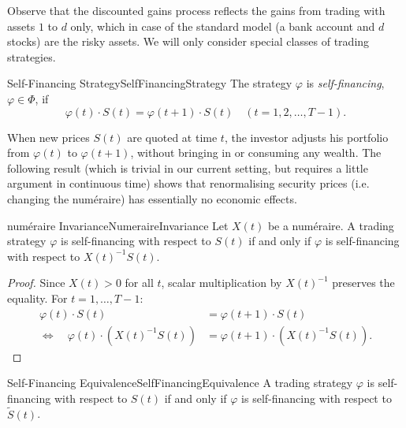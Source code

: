 Observe that the discounted gains process reflects the gains from trading with assets $1$ to $d$ only, which in case of the standard model (a bank account and $d$ stocks) are the risky assets. We will only consider special classes of trading strategies.

\begin{defn}{Self-Financing Strategy}{SelfFinancingStrategy}
	The strategy $\varphi$ is \emph{self-financing}, $\varphi \in \Phi$, if
	\begin{equation}
		\varphi(t) \cdot S(t) = \varphi(t+1) \cdot S(t) \quad (t=1, 2, \dots, T-1).
		\label{eq:SelfFinancingCondition}
	\end{equation}
\end{defn}

\begin{xtip}
	When new prices $S(t)$ are quoted at time $t$, the investor adjusts his portfolio from $\varphi(t)$ to $\varphi(t+1)$, without bringing in or consuming any wealth. The following result (which is trivial in our current setting, but requires a little argument in continuous time) shows that renormalising security prices (i.e. changing the num\'{e}raire) has essentially no economic effects.
\end{xtip}

\begin{prop}{num\'{e}raire Invariance}{NumeraireInvariance}
	Let $X(t)$ be a num\'{e}raire. A trading strategy $\varphi$ is self-financing with respect to $S(t)$ if and only if $\varphi$ is self-financing with respect to $X(t)^{-1}S(t)$.
\end{prop}

\begin{proof}
	Since $X(t) > 0$ for all $t$, scalar multiplication by $X(t)^{-1}$ preserves the equality. For $t=1, \dots, T-1$:
	\begin{align*}
		\varphi(t) \cdot S(t)                       & = \varphi(t+1) \cdot S(t)             \\
		\iff \quad \varphi(t) \cdot (X(t)^{-1}S(t)) & = \varphi(t+1) \cdot (X(t)^{-1}S(t)).
	\end{align*}
\end{proof}

\begin{cor}{Self-Financing Equivalence}{SelfFinancingEquivalence}
	A trading strategy $\varphi$ is self-financing with respect to $S(t)$ if and only if $\varphi$ is self-financing with respect to $\tilde{S}(t)$.
\end{cor}

